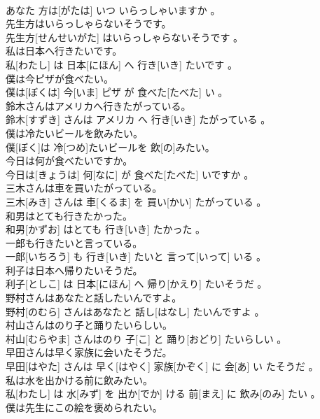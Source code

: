 \documentclass[8pt]{extreport}
\begin{document}
\begin{CJK}{UTF8}{min}
\\	あなた 方は[がたは] いつ いらっしゃいますか 。
\\	先生方はいらっしゃらないそうです。	
\\	先生方[せんせいがた] はいらっしゃらないそうです 。
\\	私は日本へ行きたいです。	
\\	私[わたし] は 日本[にほん] へ 行き[いき] たいです 。
\\	僕は今ピザが食べたい。	
\\	僕は[ぼくは] 今[いま] ピザ が 食べた[たべた] い 。
\\	鈴木さんはアメリカへ行きたがっている。	
\\	鈴木[すずき] さんは アメリカ へ 行き[いき] たがっている 。
\\	僕は冷たいビールを飲みたい。	
\\	僕[ぼく]は 冷[つめ]たいビールを 飲[の]みたい。
\\	今日は何が食べたいですか。	
\\	今日は[きょうは] 何[なに] が 食べた[たべた] いですか 。
\\	三木さんは車を買いたがっている。	
\\	三木[みき] さんは 車[くるま] を 買い[かい] たがっている 。
\\	和男はとても行きたかった。	
\\	和男[かずお] はとても 行き[いき] たかった 。
\\	一郎も行きたいと言っている。	
\\	一郎[いちろう] も 行き[いき] たいと 言って[いって] いる 。
\\	利子は日本へ帰りたいそうだ。	
\\	利子[としこ] は 日本[にほん] へ 帰り[かえり] たいそうだ 。
\\	野村さんはあなたと話したいんですよ。	
\\	野村[のむら] さんはあなたと 話し[はなし] たいんですよ 。
\\	村山さんはのり子と踊りたいらしい。	
\\	村山[むらやま] さんはのり 子[こ] と 踊り[おどり] たいらしい 。
\\	早田さんは早く家族に会いたそうだ。	
\\	早田[はやた] さんは 早く[はやく] 家族[かぞく] に 会[あ] い たそうだ 。
\\	私は水を出かける前に飲みたい。	
\\	私[わたし] は 水[みず] を 出か[でか] ける 前[まえ] に 飲み[のみ] たい 。
\\	僕は先生にこの絵を褒められたい。	

\end{CJK}
\end{document}
